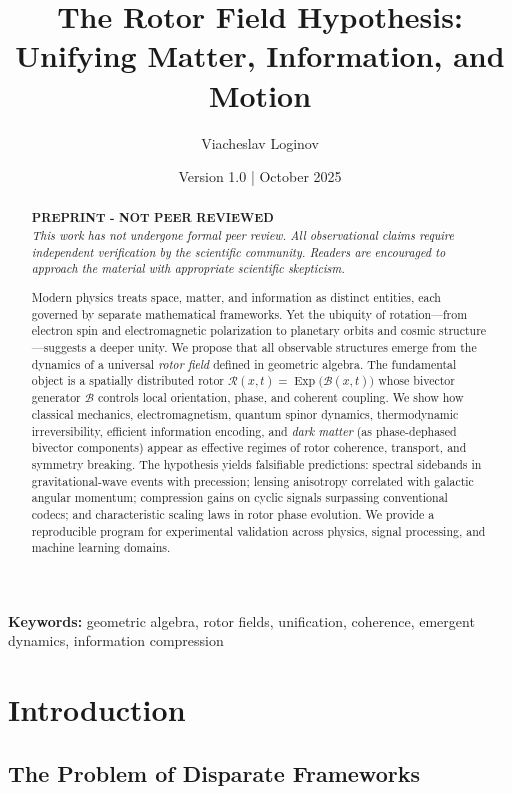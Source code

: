 \documentclass[11pt,a4paper]{article}
\title{\textbf{The Rotor Field Hypothesis: Unifying Matter, Information, and Motion}}
\author[1]{Viacheslav Loginov}
\affil[1]{Kyiv, Ukraine\\ \texttt{barthez.slavik@gmail.com}}
\date{\small Version 1.0 \quad|\quad 10 October 2025}
\newcommand{\Exp}{\operatorname{Exp}}
\newcommand{\Rotor}{\mathcal{R}}
\newcommand{\Biv}{\mathcal{B}}
\theoremstyle{definition}
\theoremstyle{plain}
\theoremstyle{remark}
\begin{document}
\maketitle

\begin{abstract}
\noindent
\textbf{PREPRINT - NOT PEER REVIEWED}\\
\textit{This work has not undergone formal peer review. All observational claims require independent verification by the scientific community. Readers are encouraged to approach the material with appropriate scientific skepticism.}

\medskip
\noindent\noindent
Modern physics treats space, matter, and information as distinct entities, each governed by separate mathematical frameworks. Yet the ubiquity of rotation---from electron spin and electromagnetic polarization to planetary orbits and cosmic structure---suggests a deeper unity. We propose that all observable structures emerge from the dynamics of a universal \emph{rotor field} defined in geometric algebra. The fundamental object is a spatially distributed rotor $\Rotor(x,t)=\Exp\!\big(\Biv(x,t)\big)$ whose bivector generator $\Biv$ controls local orientation, phase, and coherent coupling. We show how classical mechanics, electromagnetism, quantum spinor dynamics, thermodynamic irreversibility, efficient information encoding, and \emph{dark matter} (as phase-dephased bivector components) appear as effective regimes of rotor coherence, transport, and symmetry breaking. The hypothesis yields falsifiable predictions: spectral sidebands in gravitational-wave events with precession; lensing anisotropy correlated with galactic angular momentum; compression gains on cyclic signals surpassing conventional codecs; and characteristic scaling laws in rotor phase evolution. We provide a reproducible program for experimental validation across physics, signal processing, and machine learning domains.
\end{abstract}

\noindent\textbf{Keywords:} geometric algebra, rotor fields, unification, coherence, emergent dynamics, information compression

\vspace{1em}

\section{Introduction}

\subsection{The Problem of Disparate Frameworks}
\end{document}
